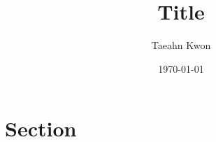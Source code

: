 \documentclass{article}
\title{Title}
\author{Taeahn Kwon}
\date{\today}
\begin{document}
\maketitle

\tableofcontents

\section{Section}



\end{document}
